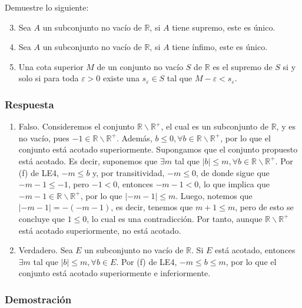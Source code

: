 \documentclass[11pt]{article}
\newcommand{\R}{\mathbb{R}}
\begin{document}
Demuestre lo siguiente:

\begin{enumerate}[label=\arabic*.]\setcounter{enumi}{2}
    \item Sea $A$ un subconjunto no vacío de $\R$, si $A$ tiene supremo, este es único.
    \item Sea $A$ un subconjunto no vacío de $\R$, si $A$ tiene ínfimo, este es único.
    \item Una cota superior $M$ de un conjunto no vacío $S$ de $\R$ es el supremo de $S$ si y solo si para toda $\varepsilon>0$ existe una $s_\varepsilon \in S$ tal que $M-\varepsilon<s_\varepsilon$.
\end{enumerate}

\subsubsection*{Respuesta}

\begin{enumerate}[label=\arabic*.]
    \item Falso. Consideremos el conjunto $\R\backslash \R^+$, el cual es un subconjunto de $\R$, y es no vacío, pues $-1\in \R\backslash \R^+$. Además, $b\leq 0, \forall b\in \R\backslash\R^+$, por lo que el conjunto está acotado superiormente. Supongamos que el conjunto propuesto está acotado. Es decir, suponemos que $\exists m$ tal que $|b|\leq m, \forall b\in \R\backslash \R^+$. Por (f) de LE4, $-m \leq b$ y, por transitividad, $-m\leq 0$, de donde sigue que $-m-1\leq -1$, pero $-1<0$, entonces $-m-1<0$, lo que implica que $-m-1\in \R\backslash \R^+$, por lo que $|-m-1|\leq m$. Luego, notemos que $|-m-1|=-(-m-1)$, es decir, tenemos que $m+1\leq m$, pero de esto se concluye que $1\leq 0$, lo cual es una contradicción. Por tanto, aunque $\R\backslash \R^+$ está acotado superiormente, no está acotado.
    \item Verdadero. Sea $E$ un subconjunto no vacío de $\R$. Si $E$ está acotado, entonces $\exists m$ tal que $|b|\leq m,\forall b \in E$. Por (f) de LE4, $-m\leq b \leq m$, por lo que el conjunto está acotado superiormente e inferiormente.
\end{enumerate}

\subsubsection*{Demostración}
\end{document}
